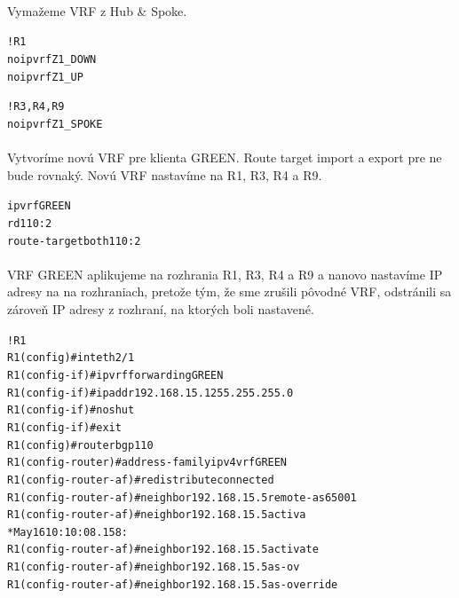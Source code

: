 \documentclass[12pt,twoside,a4paper]{report}
\begin{document}
\paragraph{}
Vymažeme VRF z Hub \& Spoke.

\noindent
{\selectfont
\begin{small}
\begin{alltt}
!R1
no ip vrf Z1_DOWN
no ip vrf Z1_UP

!R3, R4, R9
no ip vrf Z1_SPOKE
\end{alltt}
\end{small}
}

\paragraph{}
Vytvoríme novú VRF pre klienta GREEN. Route target import a export pre ne bude rovnaký. Novú VRF nastavíme na R1, R3, R4 a R9.

\noindent
{\selectfont
\begin{small}
\begin{alltt}
ip vrf GREEN
  rd 110:2
  route-target both 110:2
\end{alltt}
\end{small}
}

\paragraph{}
VRF GREEN aplikujeme na rozhrania R1, R3, R4 a R9 a nanovo nastavíme IP adresy na na rozhraniach, pretože tým, že sme zrušili pôvodné VRF, odstránili sa zároveň IP adresy z rozhraní, na ktorých boli nastavené.

\noindent
{\selectfont
\begin{small}
\begin{alltt}
!R1
R1(config)#int eth2/1
R1(config-if)#ip vrf forwarding GREEN
R1(config-if)#ip addr 192.168.15.1 255.255.255.0
R1(config-if)#no shut
R1(config-if)#exit
R1(config)#router bgp 110          
R1(config-router)#address-family ipv4 vrf GREEN
R1(config-router-af)#redistribute connected
R1(config-router-af)#neighbor 192.168.15.5 remote-as 65001
R1(config-router-af)#neighbor 192.168.15.5 activa         
*May 16 10:10:08.158: %
R1(config-router-af)#neighbor 192.168.15.5 activate
R1(config-router-af)#neighbor 192.168.15.5 as-ov   
R1(config-router-af)#neighbor 192.168.15.5 as-override
\end{alltt}
\end{small}
}
\end{document}
